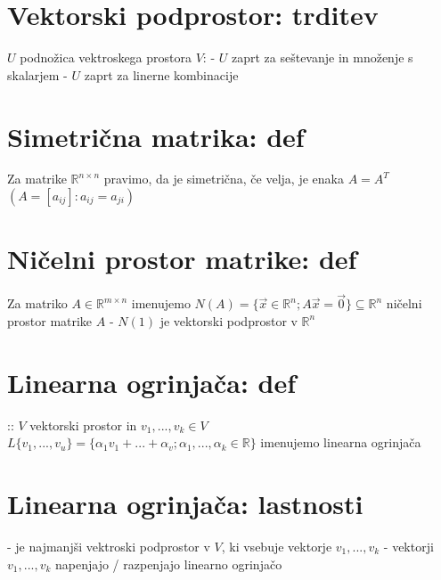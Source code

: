\documentclass{article}
\begin{document}
    \section*{ Vektorski podprostor: trditev }
    \(U\) podnožica vektroskega prostora \(V\): 
    - \(U\) zaprt za seštevanje in množenje s skalarjem 
    - \(U\) zaprt za linerne kombinacije

    \section*{ Simetrična matrika: def }
    Za matrike \(\mathbb{R}^{n \times n}\) pravimo, da je simetrična, če velja, je enaka \(A = A^T\) 
    \((A=[a_{ij}]: a_{ij} = a_{ji})\)

    \section*{ Ničelni prostor matrike: def }
    Za matriko \(A \in \mathbb{R}^{m \times n}\) imenujemo 
    \(N(A) = \{\vec{x} \in \mathbb{R}^n; A\vec{x} = \vec{0}\} \subseteq \mathbb{R}^n\) ničelni prostor matrike \(A\) 
    - \(N(1)\) je vektorski podprostor v \(\mathbb{R}^n\)

    \section*{ Linearna ogrinjača: def }
    :: \(V\) vektorski prostor in \(v_1, ..., v_k \in V\) 
    \(L\{ v_1, ..., v_u  \} = \{ \alpha_1 v_1 + ... + \alpha_v; \alpha_1, ..., \alpha_k \in \mathbb{R}\}\) 
    imenujemo linearna ogrinjača 
    
    \section*{ Linearna ogrinjača: lastnosti }
    - je najmanjši vektroski podprostor v \(V\), ki vsebuje vektorje \(v_1, ..., v_k\) 
    - vektorji \(v_1, ..., v_k\) napenjajo / razpenjajo linearno ogrinjačo

    \section*{  }

    \section*{  }

    \section*{  }
\end{document}
